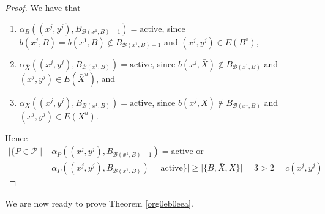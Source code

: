 \documentclass[fontsize=11pt,paper=a4]{book}
\begin{document}
\begin{proof}
We have that

\begin{enumerate}
\item \(\alpha_B((x^j,y^j),B_{\mathcal{B}(x^1,B)-1})=\mathrm{active}\), since \(b(x^j,B)=b(x^1,B)\notin B_{\mathcal{B}(x^1,B)-1}\) and \((x^j,y^j)\in E(B^o)\),

\item \(\alpha_{\bar{X}}((x^j,y^j),B_{\mathcal{B}(x^1,B)})=\mathrm{active}\), since \(b(x^j,\bar{X})\notin B_{\mathcal{B}(x^1,B)}\) and \((x^j,y^j)\in E(\bar{X}^u)\), and

\item \(\alpha_{X}((x^j,y^j),B_{\mathcal{B}(x^1,B)})=\mathrm{active}\), since \(b(x^j,X)\notin B_{\mathcal{B}(x^1,B)}\) and \((x^j,y^j)\in E(X^u)\).
\end{enumerate}

Hence
\begin{align*}
\lvert\{P\in\mathcal{P}\mid&\alpha_P((x^j,y^j),B_{\mathcal{B}(x^1,B)-1})=\mathrm{active}\text{ or }\\
&\alpha_P((x^j,y^j),B_{\mathcal{B}(x^1,B)})=\mathrm{active}\}\rvert\geq\lvert\{B,\bar{X},X\}\rvert=3>2=c(x^j,y^j)
\end{align*}
\end{proof}

We are now ready to prove Theorem \ref{org0eb0eea}.
\end{document}
